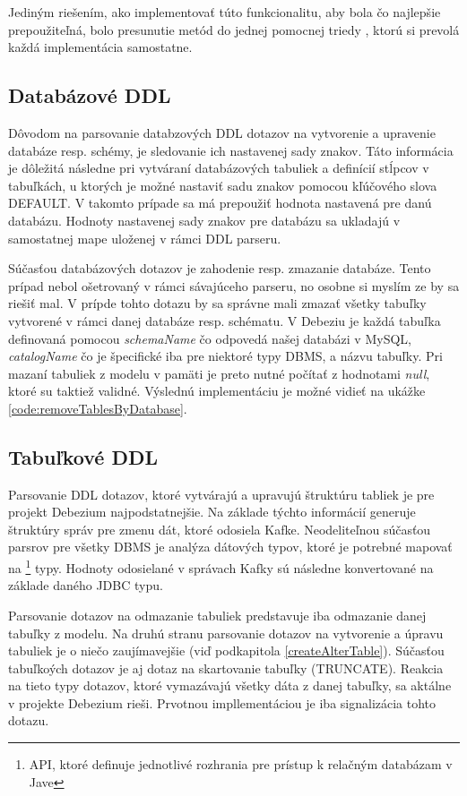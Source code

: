 Jediným riešením, ako implementovať túto funkcionalitu, aby bola čo najlepšie prepoužiteľná, bolo presunutie metód do jednej pomocnej triedy , ktorú si prevolá každá implementácia samostatne.

\subsection{Databázové DDL}
Dôvodom na parsovanie databzových DDL dotazov na vytvorenie a upravenie databáze resp. schémy, je sledovanie ich nastavenej sady znakov. Táto informácia je dôležitá následne pri vytváraní databázových tabuliek a definícií stĺpcov v tabuľkách, u ktorých je možné nastaviť sadu znakov pomocou kľúčového slova DEFAULT. V takomto prípade sa má prepoužiť hodnota nastavená pre danú databázu\cite{mysql:reference_manual}. Hodnoty nastavenej sady znakov pre databázu sa ukladajú v samostatnej mape uloženej v rámci DDL parseru.

Súčasťou databázových dotazov je zahodenie resp. zmazanie databáze. Tento prípad nebol ošetrovaný v rámci sávajúceho parseru, no osobne si myslím ze by sa riešiť mal. V prípde tohto dotazu by sa správne mali zmazať všetky tabuľky vytvorené v rámci danej databáze resp. schématu. V Debeziu je každá tabuľka definovaná pomocou \textit{schemaName} čo odpovedá našej databázi v MySQL, \textit{catalogName} čo je špecifické iba pre niektoré typy DBMS, a názvu tabuľky. Pri mazaní tabuliek z modelu v pamäti je preto nutné počítať z hodnotami \textit{null}, ktoré su taktiež validné. Výslednú implementáciu je možné vidieť na ukážke \ref{code:removeTablesByDatabase}.

\subsection{Tabuľkové DDL}
Parsovanie DDL dotazov, ktoré vytvárajú a upravujú štruktúru tabliek je pre projekt Debezium najpodstatnejšie. Na základe týchto informácií generuje štruktúry správ pre zmenu dát, ktoré odosiela Kafke. Neodeliteľnou súčasťou parsrov pre všetky DBMS je analýza dátových typov, ktoré je potrebné mapovať na \footnote{API, ktoré definuje jednotlivé rozhrania pre prístup k relačným databázam v Jave} typy. Hodnoty odosielané v správach Kafky sú následne konvertované na základe daného JDBC typu.

Parsovanie dotazov na odmazanie tabuliek predstavuje iba odmazanie danej tabuľky z modelu. Na druhú stranu parsovanie dotazov na vytvorenie a úpravu tabuliek je o niečo zaujímavejšie (viď podkapitola \ref{createAlterTable}). Súčasťou tabuľkoých dotazov je aj dotaz na skartovanie tabuľky (TRUNCATE). Reakcia na tieto typy dotazov, ktoré vymazávajú všetky dáta z danej tabuľky, sa aktálne v projekte Debezium rieši. Prvotnou impllementáciou je iba signalizácia tohto dotazu.


